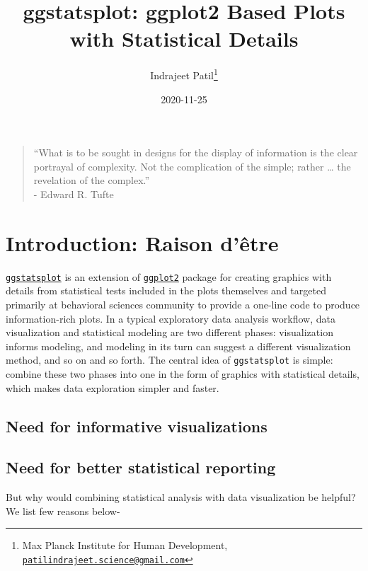 \documentclass[
]{article}
\title{ggstatsplot: ggplot2 Based Plots with Statistical Details}
\author{Indrajeet Patil\footnote{Max Planck Institute for Human Development, \href{mailto:patilindrajeet.science@gmail.com}{\nolinkurl{patilindrajeet.science@gmail.com}}}}
\date{2020-11-25}
\begin{document}
\maketitle

{
\hypersetup{linkcolor=}
\setcounter{tocdepth}{2}
\tableofcontents
}
\begin{quote}
``What is to be sought in designs for the display of information is the clear
portrayal of complexity. Not the complication of the simple; rather \ldots{} the
revelation of the complex.''\\
- Edward R. Tufte
\end{quote}

\hypertarget{introduction-raison-duxeatre}{%
\section{Introduction: Raison d'être}\label{introduction-raison-duxeatre}}

\href{https://indrajeetpatil.github.io/ggstatsplot/}{\texttt{ggstatsplot}} is an extension
of \href{https://github.com/tidyverse/ggplot2}{\texttt{ggplot2}} package for creating
graphics with details from statistical tests included in the plots themselves
and targeted primarily at behavioral sciences community to provide a one-line
code to produce information-rich plots. In a typical exploratory data analysis
workflow, data visualization and statistical modeling are two different phases:
visualization informs modeling, and modeling in its turn can suggest a
different visualization method, and so on and so forth. The central idea of
\texttt{ggstatsplot} is simple: combine these two phases into one in the form of
graphics with statistical details, which makes data exploration simpler and
faster.

\hypertarget{need-for-informative-visualizations}{%
\subsection{Need for informative visualizations}\label{need-for-informative-visualizations}}

\hypertarget{need-for-better-statistical-reporting}{%
\subsection{Need for better statistical reporting}\label{need-for-better-statistical-reporting}}

But why would combining statistical analysis with data visualization be helpful?
We list few reasons below-
\end{document}
